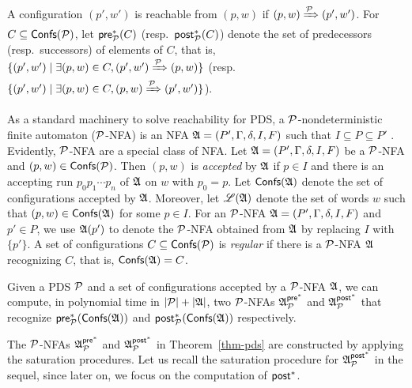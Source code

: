 A configuration $(p',w')$ is reachable from $(p,w)$ if $(p,w)\xRightarrow{{\mathcal{P} }}(p',w')$. For $C \subseteq {\mathsf{Confs} }({\mathcal{P} })$, let ${\mathsf{pre} }^*_{\mathcal{P} }(C)$ (resp.\ ${\mathsf{post} }^*_{\mathcal{P} }(C)$) denote the set of predecessors (resp.\ successors) of elements of $C$, that is, $\{(p',w')\mid \exists (p,w)\in C,(p',w')\xRightarrow{{\mathcal{P} }}(p,w)\}$ (resp.\ $\{(p',w')\mid \exists (p,w)\in C,(p,w)\xRightarrow{{\mathcal{P} }}(p',w')\}$).


As a standard machinery to solve reachability for PDS, a ${\mathcal{P} }$-nondeterministic finite automaton (${\mathcal{P} }$-NFA) is an NFA ${\mathfrak{A} }=(P', \Gamma, \delta, I, F)$ such that $I \subseteq P \subseteq P'$ \cite{BEM97}.
Evidently, ${\mathcal{P} }$-NFA are a special class of NFA. 
Let ${\mathfrak{A} } = (P', \Gamma, \delta, I, F)$ be a  ${\mathcal{P} }$-NFA and  $(p, w) \in {\mathsf{Confs} }({\mathcal{P} })$. Then $(p, w)$ is \emph{accepted} by ${\mathfrak{A} }$ if $p \in I$ and there is an accepting run $p_0 p_1 \cdots p_n$ of ${\mathfrak{A} }$ on $w$ with $p_0 = p$. Let ${\mathsf{Confs} }({\mathfrak{A} })$ denote the set of configurations accepted by ${\mathfrak{A} }$. Moreover, let ${\mathscr{L} }({\mathfrak{A} })$ denote the set of words $w$ such that $(p, w) \in {\mathsf{Confs} }({\mathfrak{A} })$ for some $p \in I$. 
For an ${\mathcal{P} }$-NFA ${\mathfrak{A} } = (P', \Gamma, \delta, I, F)$ and $p' \in P$, we use ${\mathfrak{A} }(p')$ to denote the ${\mathcal{P} }$-NFA obtained from ${\mathfrak{A} }$ by replacing $I$ with $\{p'\}$. A set of configurations $C \subseteq {\mathsf{Confs} }({\mathcal{P} })$ is \emph{regular} if there is a ${\mathcal{P} }$-NFA ${\mathfrak{A} }$ recognizing $C$, that is, ${\mathsf{Confs} }({\mathfrak{A} }) = C$. %

\begin{theorem}\label{thm-pds}
	Given  a PDS ${\mathcal{P} }$ and a set of configurations accepted by a ${\mathcal{P} }$-NFA ${\mathfrak{A} }$, we can compute, in polynomial time in $|{\mathcal{P} }|+|{\mathfrak{A} }|$, two ${\mathcal{P} }$-NFAs ${\mathfrak{A} }^{{\mathsf{pre} }^*}_{{\mathcal{P} }}$  and ${\mathfrak{A} }^{{\mathsf{post} }^*}_{{\mathcal{P} }}$ that recognize ${\mathsf{pre} }^*_{\mathcal{P} }({\mathsf{Confs} }({\mathfrak{A} }))$ and ${\mathsf{post} }^*_{\mathcal{P} }({\mathsf{Confs} }({\mathfrak{A} }))$ respectively.
\end{theorem}

The ${\mathcal{P} }$-NFAs ${\mathfrak{A} }^{{\mathsf{pre} }^*}_{{\mathcal{P} }}$ and ${\mathfrak{A} }^{{\mathsf{post} }^*}_{{\mathcal{P} }}$ in Theorem~\ref{thm-pds} are constructed by applying the saturation procedures. Let us recall the saturation procedure for ${\mathfrak{A} }^{{\mathsf{post} }^*}_{{\mathcal{P} }}$ in the sequel, since later on, we focus on the computation of ${\mathsf{post} }^*$.

